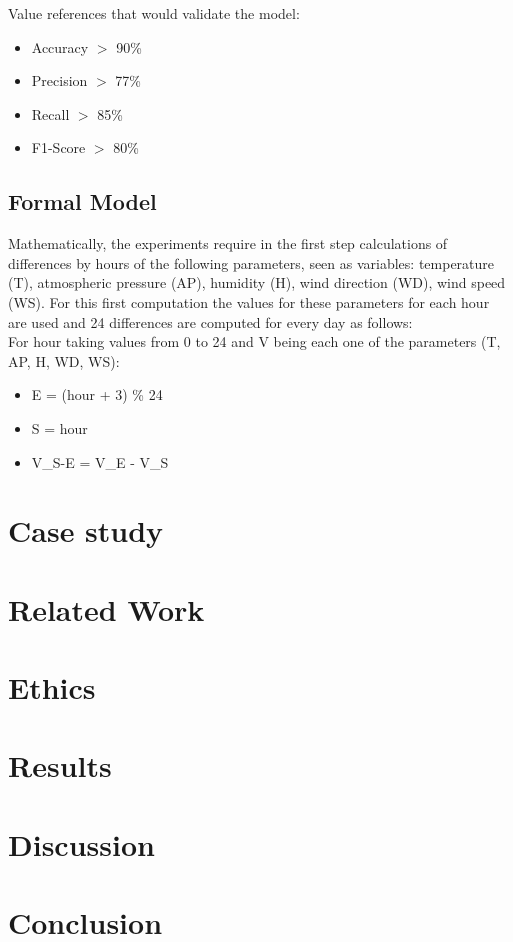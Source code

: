 \documentclass{article}
\begin{document}
Value references that would validate the model:
\begin{itemize}
    \item Accuracy $>$ 90\%
    \item Precision $>$ 77\%
    \item Recall $>$ 85\%
    \item F1-Score $>$ 80\%
\end{itemize}

\subsection{Formal Model}

Mathematically, the experiments require in the first step calculations of differences by hours of the following parameters, seen as variables: temperature (T), atmospheric pressure (AP), humidity (H), wind direction (WD), wind speed (WS). For this first computation the values for these parameters for each hour are used and 24 differences are computed for every day as follows: 
\\

For hour taking values from 0 to 24 and V being each one of the parameters (T, AP, H, WD, WS):
\begin{itemize}
    \item E = (hour + 3) \% 24
    \item S = hour 
    \item V\_S-E = V\_E - V\_S 
\end{itemize}

\section{Case study}




\section{Related Work}

\newpage
\section{Ethics}
\section{Results}
\section{Discussion}
\section{Conclusion}
\newpage

\nocite{*}
\medskip
\begin{multicols}{2}
\printbibliography[heading=bibintoc]
\end{multicols}
\end{document}
